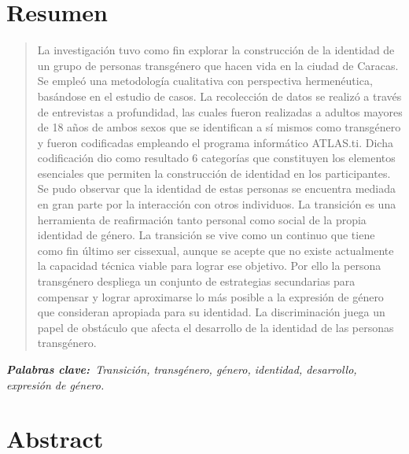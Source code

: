 \chapter{Resumen}

\begin{quote}
La investigación tuvo como fin explorar la construcción de la identidad de un
grupo de personas transgénero que hacen vida en la ciudad de Caracas. Se empleó
una metodología cualitativa con perspectiva hermenéutica, basándose en el
estudio de casos. La recolección de datos se realizó a través de entrevistas a
profundidad, las cuales fueron realizadas a adultos mayores de 18 años de ambos
sexos que se identifican a sí mismos como transgénero y fueron codificadas
empleando el programa informático ATLAS.ti\@. Dicha codificación dio como
resultado 6 categorías que constituyen los elementos esenciales que permiten la
construcción de identidad en los participantes. Se pudo observar que la
identidad de estas personas se encuentra mediada en gran parte por la
interacción con otros individuos. La transición es una herramienta de
reafirmación tanto personal como social de la propia identidad de género. La
transición se vive como un continuo que tiene como fin último ser cissexual,
aunque se acepte que no existe actualmente la capacidad técnica viable para
lograr ese objetivo. Por ello la persona transgénero despliega un conjunto de
estrategias secundarias para compensar y lograr aproximarse lo más posible a la
expresión de género que consideran apropiada para su identidad. La
discriminación juega un papel de obstáculo que afecta el desarrollo de la
identidad de las personas transgénero.
\end{quote}

\itshape\textbf{Palabras clave:}\normalfont{}\ Transición, transgénero,
género, identidad, desarrollo, expresión de género.

\chapter{Abstract}

\begin{center}
	\large\scshape\theengtitle\
\end{center}

